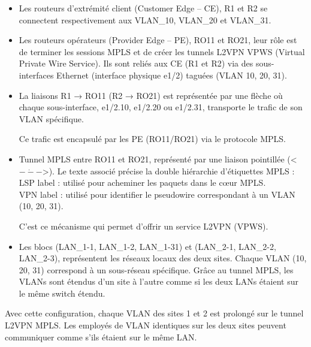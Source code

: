 \documentclass[12pt,a4paper, oneside]{memoir}
\begin{document}
\begin{itemize}
	\item Les routeurs d’extrémité client (Customer Edge – CE), R1 et R2 se connectent respectivement aux VLAN_10, VLAN_20 et VLAN_31. 
	
	\item Les routeurs opérateurs (Provider Edge – PE), RO11 et RO21,  leur rôle est de terminer les sessions MPLS et de créer les tunnels L2VPN VPWS (Virtual Private Wire Service). Ils sont reliés aux CE (R1 et R2) via des sous-interfaces Ethernet (interface physique e1/2) taguées (VLAN 10, 20, 31).
	
	\item La liaisons R1 → RO11 (R2 → RO21) est représentée par une flèche où chaque sous-interface, e1/2.10, e1/2.20 ou e1/2.31, transporte le trafic de son VLAN spécifique.
	
	Ce trafic est encapsulé par les PE (RO11/RO21) via le protocole MPLS.
	
	\item Tunnel MPLS entre RO11 et RO21, représenté par une liaison pointillée ({\color{red}<$\dot{---}$>}). Le texte associé précise la double hiérarchie d’étiquettes MPLS :\\
	LSP label : utilisé pour acheminer les paquets dans le cœur MPLS.\\
	VPN label : utilisé pour identifier le pseudowire correspondant à un VLAN (10, 20, 31).
	
	C’est ce mécanisme qui permet d’offrir un service L2VPN (VPWS).
	
	\item Les blocs (LAN_1-1, LAN_1-2, LAN_1-31) et (LAN_2-1, LAN_2-2, LAN_2-3), représentent les réseaux locaux des deux sites. Chaque VLAN (10, 20, 31) correspond à un sous-réseau spécifique. Grâce au tunnel MPLS, les VLANs sont étendus d’un site à l’autre comme si les deux LANs étaient sur le même switch étendu.
\end{itemize}

Avec cette configuration, chaque VLAN des sites 1 et 2 est prolongé sur le tunnel L2VPN MPLS. Les employés de VLAN identiques sur les deux sites peuvent communiquer comme s’ils étaient sur le même LAN.
\end{document}
